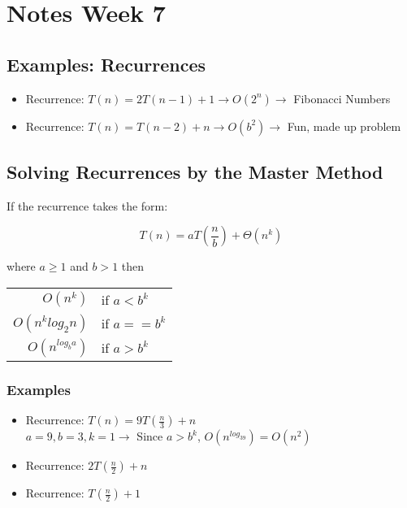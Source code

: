 \documentclass[12pt]{article}
\begin{document}
\section*{Notes Week 7}

\subsection*{Examples: Recurrences}

\begin{itemize}

    \item Recurrence: $T(n) = 2T(n-1) + 1 \rightarrow O(2^n) \rightarrow$ Fibonacci Numbers

    \item Recurrence: $T(n) = T(n-2) + n \rightarrow O(b^2) \rightarrow$ Fun, made up problem

\end{itemize}

\subsection*{Solving Recurrences by the Master Method}
If the recurrence takes the form: 

\begin{equation*}
    T(n) = aT(\frac{n}{b}) + \Theta(n^k)
\end{equation*}    

where $a \geq 1$ and $b > 1$ then

\begin{center}
    \begin{tabular}{r l}
        $O(n^k)$ & if $a < b^k$ \\
        $O(n^klog_2n)$ & if $a == b^k$ \\
        $O(n^{log_ba})$ & if $ a > b^k$
    \end{tabular}
\end{center}

\subsubsection*{Examples}

\begin{itemize}
    \item Recurrence: $T(n) = 9T(\frac{n}{3}) + n$ \\
    $a = 9, b = 3, k = 1 \rightarrow$ Since $a > b^k$, $O(n^{log_39}) = O(n^2)$

    \item Recurrence: $2T(\frac{n}{2}) + n$

    \item Recurrence: $T(\frac{n}{2}) + 1$

\end{itemize}
\end{document}
